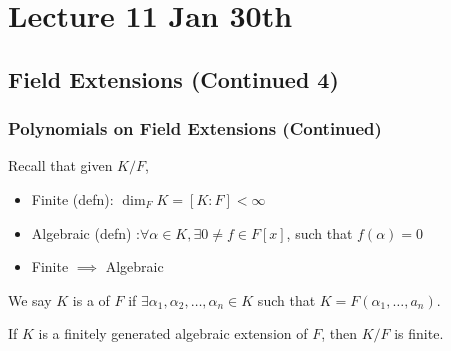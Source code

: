 \documentclass[notoc,notitlepage]{tufte-book}
\begin{document}



\chapter{Lecture 11 Jan 30th}%
\label{chp:lecture_11_jan_30th}

\section{Field Extensions (Continued 4)}%
\label{sec:field_extensions_continued_4}

\subsection{Polynomials on Field Extensions (Continued)}%
\label{sub:polynomials_on_field_extensions_continued}

\begin{note}
  Recall that given $K / F$,
  \begin{itemize}
    \item Finite (defn): $\dim_F K = [ K : F ] < \infty$
    \item Algebraic (defn) :$\forall \alpha \in K, \exists 0 \neq f \in F[x]$, such that
      $f(\alpha) = 0$
    \item Finite $\implies$ Algebraic
  \end{itemize}
\end{note}

\begin{defn}\label{defn:finitely_generated_extension}
  We say $K$ is a  of $F$ if $\exists \alpha_1,
  \alpha_2, \ldots, \alpha_n \in K$ such that $K = F(\alpha_1, \ldots, a_n)$.
\end{defn}

\begin{propo}\label{propo:finitely_generated_algebraic_extensions_are_finite}
  If $K$ is a finitely generated algebraic extension of $F$, then $K / F$ is finite.
\end{propo}
\end{document}
